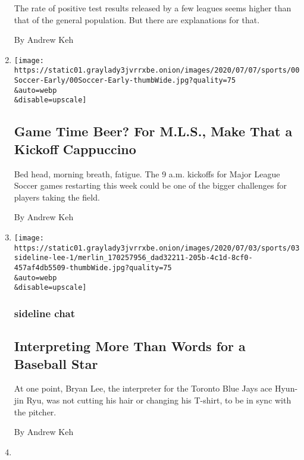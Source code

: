 \begin{enumerate}
  The rate of positive test results released by a few leagues seems
  higher than that of the general population. But there are explanations
  for that.

  By Andrew Keh
\item
  \href{/2020/07/09/sports/soccer/coronavirus-mls-soccer-return.html}{}

  \texttt{[image: https://static01.graylady3jvrrxbe.onion/images/2020/07/07/sports/00Soccer-Early/00Soccer-Early-thumbWide.jpg?quality=75\\\&auto=webp\\\&disable=upscale]}

  \hypertarget{game-time-beer-for-mls-make-that-a-kickoff-cappuccino}{%
  \subsection{Game Time Beer? For M.L.S., Make That a Kickoff
  Cappuccino}\label{game-time-beer-for-mls-make-that-a-kickoff-cappuccino}}

  Bed head, morning breath, fatigue. The 9 a.m. kickoffs for Major
  League Soccer games restarting this week could be one of the bigger
  challenges for players taking the field.

  By Andrew Keh
\item
  \href{/2020/07/04/sports/baseball/Hyun-jin-Ryu-blue-jays.html}{}

  \texttt{[image: https://static01.graylady3jvrrxbe.onion/images/2020/07/03/sports/03sideline-lee-1/merlin\_170257956\_dad32211-205b-4c1d-8cf0-457af4db5509-thumbWide.jpg?quality=75\\\&auto=webp\\\&disable=upscale]}

  \hypertarget{sideline-chat}{%
  \subsubsection{sideline chat}\label{sideline-chat}}

  \hypertarget{interpreting-more-than-words-for-a-baseball-star}{%
  \subsection{Interpreting More Than Words for a Baseball
  Star}\label{interpreting-more-than-words-for-a-baseball-star}}

  At one point, Bryan Lee, the interpreter for the Toronto Blue Jays ace
  Hyun-jin Ryu, was not cutting his hair or changing his T-shirt, to be
  in sync with the pitcher.

  By Andrew Keh
\item
  \href{/2020/07/03/sports/coronavirus-players-nba-mlb-opt-out.html}{}


\end{enumerate}
